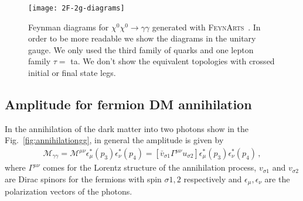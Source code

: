 %
\begin{figure}
\centering
\texttt{[image: 2F-2g-diagrams]}
\caption{Feynman diagrams for $\chi^0\chi^0 \to\gamma\gamma$ generated with \textsc{FeynArts}~\cite{Hahn:2000kx}. In order to be more readable we show the diagrams in the unitary gauge. We only used the third family of quarks and one lepton family $\tau= $ ta.  We don't show the equivalent topologies with crossed initial or final state legs.}
\label{fig:2F-to-GG}
\end{figure}
%


\subsection{Amplitude for fermion DM annihilation}

In the annihilation of the dark matter into two photons show in the Fig.~\ref{fig:annihilationgg}, in general the amplitude is given by
\begin{align}
\label{eq:M1-fermion-GG}
\mathcal{M}_{\gamma\gamma}=\mathcal{M}^{\mu\nu}\epsilon_{\mu}^*(p_3)\epsilon_{\nu}^*(p_4)=\left[\bar{v}_{\sigma 1}\Gamma^{\mu\nu}u_{\sigma 2}\right]\epsilon_{\mu}^*(p_3)\epsilon_{\nu}^*(p_4)\,,
\end{align}
%
where $\Gamma^{\mu\nu}$ comes for the Lorentz structure of the annihilation process, $v_{\sigma 1}$ and $v_{\sigma 2}$ are Dirac spinors for the fermions with spin $\sigma 1,2$ respectively and $\epsilon_{\mu},\epsilon_{\nu}$ are the polarization vectors of the photons. 

